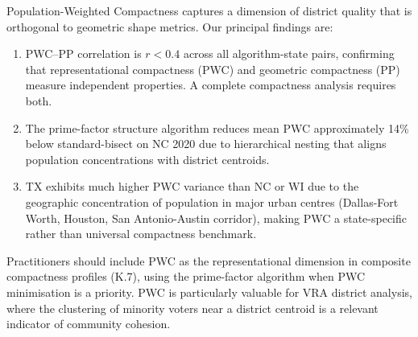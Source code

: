 Population-Weighted Compactness captures a dimension of district quality that
is orthogonal to geometric shape metrics.
Our principal findings are:

\begin{enumerate}
  \item PWC--PP correlation is $r < 0.4$ across all algorithm-state pairs,
    confirming that representational compactness (PWC) and geometric compactness
    (PP) measure independent properties. A complete compactness analysis requires both.
  \item The prime-factor structure algorithm reduces mean PWC approximately 14\%
    below standard-bisect on NC 2020 due to hierarchical nesting that aligns
    population concentrations with district centroids.
  \item TX exhibits much higher PWC variance than NC or WI due to the geographic
    concentration of population in major urban centres (Dallas-Fort Worth, Houston,
    San Antonio-Austin corridor), making PWC a state-specific rather than universal
    compactness benchmark.
\end{enumerate}

Practitioners should include PWC as the representational dimension in composite
compactness profiles (K.7), using the prime-factor algorithm when PWC minimisation
is a priority.
PWC is particularly valuable for VRA district analysis, where the clustering
of minority voters near a district centroid is a relevant indicator of
community cohesion.
